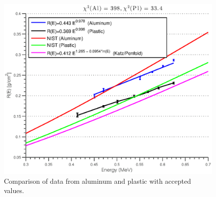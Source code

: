 \begin{figure}[htbp]
  \centering 
  \includegraphics[width=\MyWidth]{Figures/alum_plas_NIST_plot.eps}
  \caption{Comparison of data from aluminum and plastic with accepted values.}
  \label{fig:Figures_alum_plas_NIST_plot}
\end{figure}%


